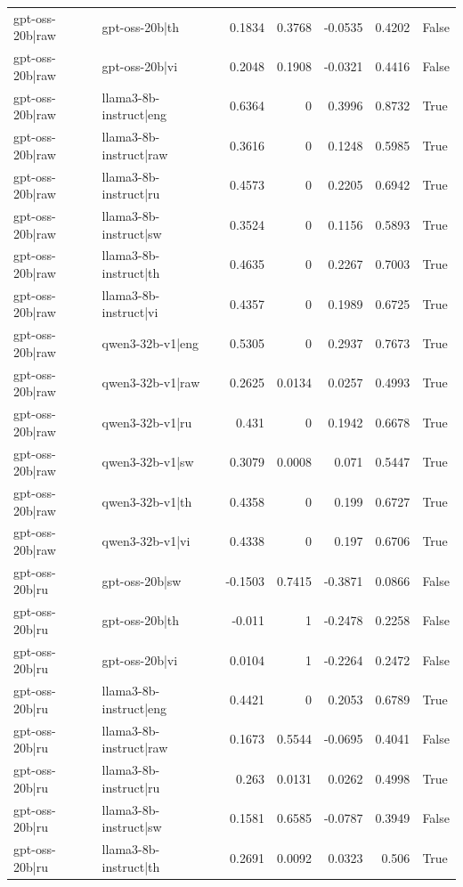 \begin{table}
\begin{tabular}{l l r r r r l}
gpt-oss-20b|raw & gpt-oss-20b|th & 0.1834 & 0.3768 & -0.0535 & 0.4202 & False \\
gpt-oss-20b|raw & gpt-oss-20b|vi & 0.2048 & 0.1908 & -0.0321 & 0.4416 & False \\
gpt-oss-20b|raw & llama3-8b-instruct|eng & 0.6364 & 0 & 0.3996 & 0.8732 & True \\
gpt-oss-20b|raw & llama3-8b-instruct|raw & 0.3616 & 0 & 0.1248 & 0.5985 & True \\
gpt-oss-20b|raw & llama3-8b-instruct|ru & 0.4573 & 0 & 0.2205 & 0.6942 & True \\
gpt-oss-20b|raw & llama3-8b-instruct|sw & 0.3524 & 0 & 0.1156 & 0.5893 & True \\
gpt-oss-20b|raw & llama3-8b-instruct|th & 0.4635 & 0 & 0.2267 & 0.7003 & True \\
gpt-oss-20b|raw & llama3-8b-instruct|vi & 0.4357 & 0 & 0.1989 & 0.6725 & True \\
gpt-oss-20b|raw & qwen3-32b-v1|eng & 0.5305 & 0 & 0.2937 & 0.7673 & True \\
gpt-oss-20b|raw & qwen3-32b-v1|raw & 0.2625 & 0.0134 & 0.0257 & 0.4993 & True \\
gpt-oss-20b|raw & qwen3-32b-v1|ru & 0.431 & 0 & 0.1942 & 0.6678 & True \\
gpt-oss-20b|raw & qwen3-32b-v1|sw & 0.3079 & 0.0008 & 0.071 & 0.5447 & True \\
gpt-oss-20b|raw & qwen3-32b-v1|th & 0.4358 & 0 & 0.199 & 0.6727 & True \\
gpt-oss-20b|raw & qwen3-32b-v1|vi & 0.4338 & 0 & 0.197 & 0.6706 & True \\
gpt-oss-20b|ru & gpt-oss-20b|sw & -0.1503 & 0.7415 & -0.3871 & 0.0866 & False \\
gpt-oss-20b|ru & gpt-oss-20b|th & -0.011 & 1 & -0.2478 & 0.2258 & False \\
gpt-oss-20b|ru & gpt-oss-20b|vi & 0.0104 & 1 & -0.2264 & 0.2472 & False \\
gpt-oss-20b|ru & llama3-8b-instruct|eng & 0.4421 & 0 & 0.2053 & 0.6789 & True \\
gpt-oss-20b|ru & llama3-8b-instruct|raw & 0.1673 & 0.5544 & -0.0695 & 0.4041 & False \\
gpt-oss-20b|ru & llama3-8b-instruct|ru & 0.263 & 0.0131 & 0.0262 & 0.4998 & True \\
gpt-oss-20b|ru & llama3-8b-instruct|sw & 0.1581 & 0.6585 & -0.0787 & 0.3949 & False \\
gpt-oss-20b|ru & llama3-8b-instruct|th & 0.2691 & 0.0092 & 0.0323 & 0.506 & True \\

\end{tabular}
\end{table}
